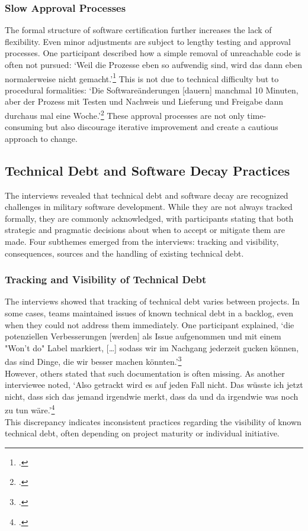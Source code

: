 \subsubsection{Slow Approval Processes}
The formal structure of software certification further increases the lack of flexibility. Even minor adjustments are subject to lengthy testing and approval processes. One participant described how a simple removal of unreachable code is often not pursued:
`Weil die Prozesse eben so aufwendig sind, wird das dann eben normalerweise nicht gemacht.'\footcite{Interview22025} This is not due to technical difficulty but to procedural formalities: `Die Softwareänderungen [dauern] manchmal 10 Minuten, aber der Prozess mit Testen und Nachweis und Lieferung und Freigabe dann durchaus mal eine Woche.'\footcite{Interview12025}
These approval processes are not only time-consuming but also discourage iterative improvement and create a cautious approach to change.\\

\subsection{Technical Debt and Software Decay Practices}
The interviews revealed that technical debt and software decay are recognized challenges in military software development. While they are not always tracked formally, they are commonly acknowledged, with participants stating that both strategic and pragmatic decisions about when to accept or mitigate them are made.
Four subthemes emerged from the interviews: tracking and visibility, consequences, sources and the handling of existing technical debt.

\subsubsection{Tracking and Visibility of Technical Debt}
The interviews showed that tracking of technical debt varies between projects. In some cases, teams maintained issues of known technical debt in a backlog, even when they could not address them immediately. One participant explained, `die potenziellen Verbesserungen [werden] als Issue aufgenommen und mit einem "Won't do" Label markiert, [\ldots]
sodass wir im Nachgang jederzeit gucken können, das sind Dinge, die wir besser machen könnten.'\footcite{Interview32025}\\
However, others stated that such documentation is often missing. As another interviewee noted, `Also getrackt wird es auf jeden Fall nicht. Das wüsste ich jetzt nicht, dass sich das jemand irgendwie merkt, dass da und da irgendwie was noch zu tun wäre.'\footcite{Interview12025}\\
This discrepancy indicates inconsistent practices regarding the visibility of known technical debt, often depending on project maturity or individual initiative.\\

